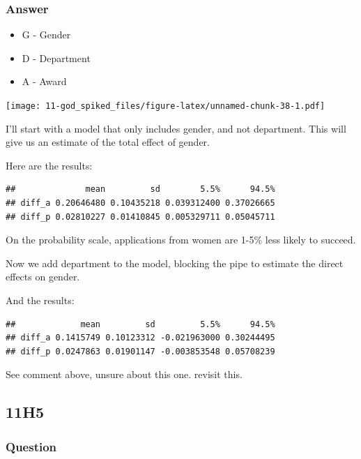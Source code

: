 \documentclass[
]{book}
\providecommand{\tightlist}{%
  \setlength{\itemsep}{0pt}\setlength{\parskip}{0pt}}
\begin{document}
\hypertarget{answer-96}{%
\subsubsection*{Answer}\label{answer-96}}

\begin{itemize}
\tightlist
\item
  G - Gender
\item
  D - Department
\item
  A - Award
\end{itemize}

\texttt{[image: 11-god\_spiked\_files/figure-latex/unnamed-chunk-38-1.pdf]}

I'll start with a model that only includes gender, and not department. This will give us an estimate of the total effect of gender.

Here are the results:

\begin{verbatim}
##              mean         sd        5.5%      94.5%
## diff_a 0.20646480 0.10435218 0.039312400 0.37026665
## diff_p 0.02810227 0.01410845 0.005329711 0.05045711
\end{verbatim}

On the probability scale, applications from women are 1-5\% less likely to succeed.

Now we add department to the model, blocking the pipe to estimate the direct effects on gender.

And the results:

\begin{verbatim}
##             mean         sd         5.5%      94.5%
## diff_a 0.1415749 0.10123312 -0.021963000 0.30244495
## diff_p 0.0247863 0.01901147 -0.003853548 0.05708239
\end{verbatim}

See comment above, unsure about this one. revisit this.

\hypertarget{h5-3}{%
\subsection*{11H5}\label{h5-3}}

\hypertarget{question-97}{%
\subsubsection*{Question}\label{question-97}}
\end{document}
